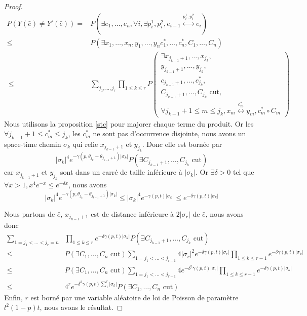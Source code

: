 \documentclass[titlepage,a4paper,12pt]{article}
\newcounter{prop}
\begin{document}
\begin{proof}
\begin{align*}
P(Y(\bar{e})\neq Y'(\bar{e})) =& P(\exists e_1,\dots,e_n, \forall i, \exists p_i^1,p_i^2, e_{i-1}\overset{p_i^1,p_i^2}{\longleftrightarrow}e_i) \\
 \leqslant &P(\exists x_1,\dots,x_n,y_1,\dots,y_n c^*_1,\dots,c^*_n,C_1,\dots,C_n) \\\
 \leqslant &\sum_{j_1,\dots,j_r}\prod_{1\leqslant k \leqslant r} P\left(\begin{array}{c}
 \exists x_{j_{k-1}+1},\dots,x_{j_k},\\
 y_{j_{k-1}+1},\dots,y_{j_k},\\
 c_{j_{k-1}+1},\dots,c^*_{j_k},\\
 C_{j_{k-1}+1},\dots,C_{j_k} \text{ cut},\\
 \forall j_{k-1}+1 \leqslant m \leqslant j_k, x_m\overset{c^*_m}{\longleftrightarrow} y_m, 
 c^*_m\circ C_m
 \end{array}
 \right)
\end{align*}
Nous utilisons la proposition \ref{stc} pour majorer chaque terme du produit. Or les $\forall j_{k-1}+1 \leqslant c^*_m \leqslant j_k$, les $c^*_m$ ne sont pas d'occurrence disjointe, nous avons un space-time chemin $\sigma_k$ qui relie $x_{j_{k-1}+1}$ et $y_{j_k}$. Donc elle est bornée par $$ \displaystyle |\sigma_k|^4 e^{-\gamma(p,\theta_{j_k}-\theta_{j_{k-1}+1})|\sigma_k|} P(\exists C_{j_{k-1}+1},\dots,C_{j_k} \text{ cut})$$ car $x_{j_{k-1}+1}$ et $y_{j_k}$ sont dans un carré de taille inférieure à $ |\sigma_k|$. Or $\exists \delta>0$ tel que $\forall x>1, x^4e^{-x} \leqslant e^{-\delta x}$, nous avons 
$$|\sigma_k|^4 e^{-\gamma(p,\theta_{j_k}-\theta_{j_{k-1}+1})|\sigma_k|} \leqslant |\sigma_k|^4 e^{-\gamma(p,t)|\sigma_k|} \leqslant e^{-\delta\gamma(p,t)|\sigma_k|}$$

Nous partons de $\bar{e}$, $x_{j_{n-1}+1}$ est de distance inférieure à $2|\sigma_r|$ de $\bar{e}$, nous avons donc 
\begin{align*}\sum_{1=j_1<\dots < j_r = n} &\prod_{1\leqslant k \leqslant r} e^{-\delta \gamma(p,t)|\sigma_k|} P(\exists C_{j_{k-1}+1},\dots,C_{j_k} \text{ cut}) \\
\leqslant & P(\exists C_1,\dots,C_n \text{ cut})\sum_{1=j_1<\dots < j_{r-1}} 4|\sigma_r|^2e^{-\delta \gamma(p,t)|\sigma_r|}\prod_{1\leqslant k \leqslant r-1}e^{-\delta \gamma(p,t)|\sigma_k|} \\
\leqslant & P(\exists C_1,\dots,C_n \text{ cut})\sum_{1=j_1<\dots < j_{r-1}} 4e^{-\delta^2 \gamma(p,t)|\sigma_r|}\prod_{1\leqslant k \leqslant r-1}e^{-\delta \gamma(p,t)|\sigma_k|} \\
\leqslant & 4^r e^{-\delta^2 \gamma(p,t)\sum_1^r|\sigma_k|}P(\exists C_1,\dots,C_n \text{ cut})
\end{align*}
Enfin, $r$ est borné par une variable aléatoire de loi de Poisson de paramètre $l^2 (1-p) t$, nous avons le résultat.
\end{proof}
\end{document}
